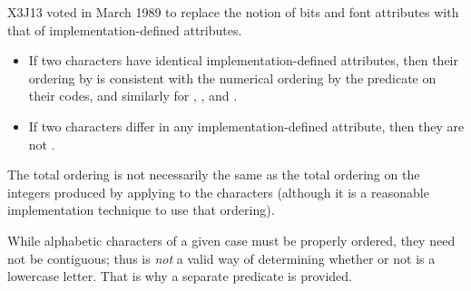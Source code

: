 \begin{defun}[Function]
\begin{newer}
X3J13 voted in March 1989 
to replace the notion of bits and font attributes with
that of implementation-defined attributes.

\begin{itemize}
\item
If two characters have identical implementation-defined attributes,
then their ordering by  is consistent with the numerical
ordering by the predicate \cd{<} on their codes, and similarly
for , , and .

\item
If two characters differ in any implementation-defined
attribute, then they are not .
\end{itemize}
\end{newer}

The total ordering is not necessarily the same as the total
ordering on the integers produced by applying  to the
characters (although it is a reasonable implementation technique to
use that ordering).

While alphabetic characters of a given case must be
properly ordered, they need not be contiguous; thus  is {\it not} a valid way of determining whether or not  is a
lowercase letter.  That is why a separate
 predicate is provided.


\end{defun}
